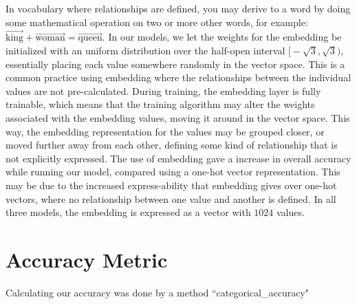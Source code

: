 In vocabulary where relationships are defined, you may derive to a word by doing some mathematical operation on two or more other words, for example:  \(\vec{\text{king}}+\vec{\text{woman}}=\vec{\text{queen}}\). In our models, we let the weights for the embedding be initialized with an uniform distribution over the half-open interval \(\big[-\sqrt{3}, \sqrt{3}\big)\), essentially placing each value somewhere randomly in the vector space. This is a common practice using embedding where the relationships between the individual values are not pre-calculated. During training, the embedding layer is fully trainable, which means that the training algorithm may alter the weights associated with the embedding values, moving it around in the vector space. This way, the embedding representation for the values may be grouped closer, or moved further away from each other, defining some kind of relationship that is not explicitly expressed. The use of embedding gave a increase in overall accuracy while running our model, compared using a one-hot vector representation. This may be due to the increased express-ability that embedding gives over one-hot vectors, where no relationship between one value and another is defined. In all three models, the embedding is expressed as a vector with \(1024\) values. 


\section{Accuracy Metric}
Calculating our accuracy was done by a method ``categorical\_accuracy"